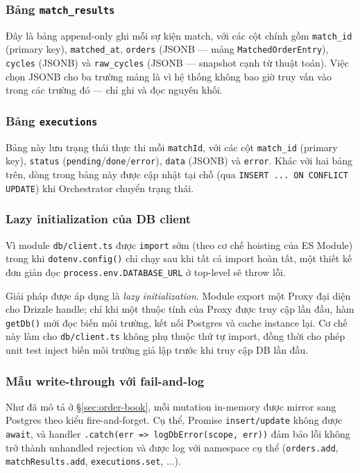 \subsubsection*{Bảng \texttt{match\_results}}

Đây là bảng append-only ghi mỗi sự kiện match, với các cột chính gồm \texttt{match\_id} (primary key), \texttt{matched\_at}, \texttt{orders} (JSONB --- mảng \texttt{MatchedOrderEntry}), \texttt{cycles} (JSONB) và \texttt{raw\_cycles} (JSONB --- snapshot cạnh từ thuật toán). Việc chọn JSONB cho ba trường mảng là vì hệ thống không bao giờ truy vấn vào trong các trường đó — chỉ ghi và đọc nguyên khối.

\subsubsection*{Bảng \texttt{executions}}

Bảng này lưu trạng thái thực thi mỗi \texttt{matchId}, với các cột \texttt{match\_id} (primary key), \texttt{status} (\texttt{pending}/\texttt{done}/\texttt{error}), \texttt{data} (JSONB) và \texttt{error}. Khác với hai bảng trên, dòng trong bảng này được cập nhật tại chỗ (qua \texttt{INSERT ... ON CONFLICT UPDATE}) khi Orchestrator chuyển trạng thái.

\subsubsection{Lazy initialization của DB client}

Vì module \texttt{db/client.ts} được \texttt{import} sớm (theo cơ chế hoisting của ES Module) trong khi \texttt{dotenv.config()} chỉ chạy sau khi tất cả import hoàn tất, một thiết kế đơn giản đọc \texttt{process.env.DATABASE\_URL} ở top-level sẽ throw lỗi.

Giải pháp được áp dụng là \emph{lazy initialization}. Module export một Proxy đại diện cho Drizzle handle; chỉ khi một thuộc tính của Proxy được truy cập lần đầu, hàm \texttt{getDb()} mới đọc biến môi trường, kết nối Postgres và cache instance lại. Cơ chế này làm cho \texttt{db/client.ts} không phụ thuộc thứ tự import, đồng thời cho phép unit test inject biến môi trường giả lập trước khi truy cập DB lần đầu.

\subsubsection{Mẫu write-through với fail-and-log}

Như đã mô tả ở \S\ref{sec:order-book}, mỗi mutation in-memory được mirror sang Postgres theo kiểu fire-and-forget. Cụ thể, Promise \texttt{insert/update} không được \texttt{await}, và handler \texttt{.catch(err => logDbError(scope, err))} đảm bảo lỗi không trở thành unhandled rejection và được log với namespace cụ thể (\texttt{orders.add}, \texttt{matchResults.add}, \texttt{executions.set}, ...).

